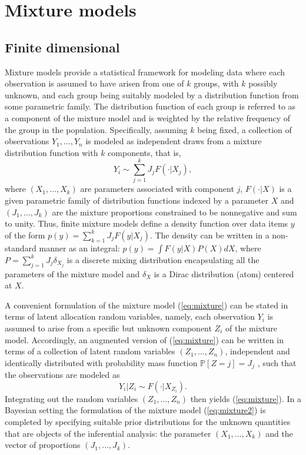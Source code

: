 \section{Mixture models}
\subsection{Finite dimensional}
Mixture models provide a statistical framework for modeling data where each observation is assumed to have arisen from one of $k$ groups, with $k$ possibly unknown, and each group being suitably modeled by a distribution function from some parametric family. The distribution function of each group is referred to as a component of the mixture model and is weighted by the relative frequency of the group in the population. Specifically, assuming $k$ being fixed, a collection of observations $Y_1,\dots,Y_n$ is modeled as independent draws from a mixture distribution function with $k$ components, that is,
\begin{equation} \label{eq:mixture}
Y_i \sim \sum_{j=1}^k{J_j F(\cdot|X_j)},
\end{equation}
where $(X_1,\dots,X_k)$ are parameters associated with component $j$, $F(\cdot|X)$ is a given parametric family of distribution functions indexed by a parameter $X$ and
$(J_1, \dots, J_k)$ are the mixture proportions constrained to be nonnegative and sum to unity.
Thus, finite mixture models define a density function over data items $y$ of the form $p(y) = \sum_{k=1}^k J_j F(y|X_j)$. The density can be written in a non-standard manner as an integral: $p(y) = \int F(y|X) P(X)dX$, where $P = \sum_{j=1}^k J_j \delta_{X_j}$ is a discrete mixing distribution encapsulating all the parameters of the mixture model and $\delta_{X}$ is a Dirac distribution (atom) centered at $X$.

A convenient formulation of the mixture model (\ref{eq:mixture}) can be stated in terms of latent allocation random variables, namely, each observation $Y_i$ is assumed to arise from a specific but unknown component $Z_i$ of the mixture model. Accordingly, an augmented version of (\ref{eq:mixture}) can be written in terms of a collection of latent random variables $(Z_1, \dots , Z_n)$, independent and identically distributed with probability mass function $\mathbb{P}[Z = j] = J_j$ , such that the observations are modeled as
\begin{equation} \label{eq:mixture2}
Y_i|Z_i \sim F(\cdot|X_{Z_i}).
\end{equation}
Integrating out the random variables $(Z_1, \dots , Z_n)$ then yields (\ref{eq:mixture}). In a Bayesian setting the formulation of the mixture model (\ref{eq:mixture2}) is completed by specifying suitable prior distributions for the unknown quantities that are objects of the inferential analysis: the parameter $(X_1, \dots, X_k)$ and the vector of proportions $(J_1, \dots, J_k)$.

